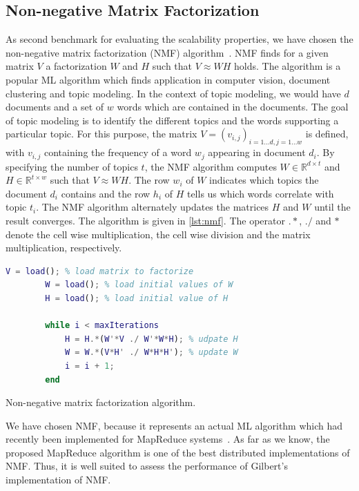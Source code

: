\subsection{Non-negative Matrix Factorization}

As second benchmark for evaluating the scalability properties, we have chosen the non-negative matrix factorization (NMF) algorithm~\cite{seung:anips2001a}.
NMF finds for a given matrix $V$ a factorization $W$ and $H$ such that $V\approx W H$ holds.
The algorithm is a popular ML algorithm which finds application in computer vision, document clustering and topic modeling.
In the context of topic modeling, we would have $d$ documents and a set of $w$ words which are contained in the documents.
The goal of topic modeling is to identify the different topics and the words supporting a particular topic.
For this purpose, the matrix $V = (v_{i,j})_{i=1\ldots d,j=1\ldots w}$ is defined, with $v_{i,j}$ containing the frequency of a word $w_j$ appearing in document $d_i$.
By specifying the number of topics $t$, the NMF algorithm computes $W\in \mathbb{R}^{d\times t}$ and $H\in \mathbb{R}^{t\times w}$ such that $V \approx W H$.
The row $w_i$ of $W$ indicates which topics the document $d_i$ contains and the row $h_i$ of $H$ tells us which words correlate with topic $t_i$.
The NMF algorithm alternately updates the matrices $H$ and $W$ until the result converges.
The algorithm is given in \cref{lst:nmf}.
The operator $.*$, $./$ and $*$ denote the cell wise multiplication, the cell wise division and the matrix multiplication, respectively.

\begin{listing}[!h]
	\begin{CenteredBox}
		\begin{lstlisting}[language=Matlab]
		V = load(); % load matrix to factorize
		W = load(); % load initial values of W
		H = load(); % load initial value of H

		while i < maxIterations
			H = H.*(W'*V ./ W'*W*H); % udpate H
			W = W.*(V*H' ./ W*H*H'); % update W
			i = i + 1;
		end
		\end{lstlisting}
	\end{CenteredBox}
	\caption{Non-negative matrix factorization algorithm.}
	\label{lst:nmf}
\end{listing}

We have chosen NMF, because it represents an actual ML algorithm which had recently been implemented for MapReduce systems~\cite{liu:2010a}.
As far as we know, the proposed MapReduce algorithm is one of the best distributed implementations of NMF.
Thus, it is well suited to assess the performance of Gilbert's implementation of NMF.

